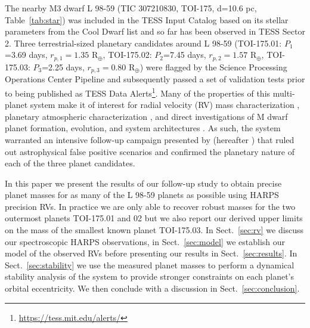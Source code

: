 \documentclass[longauth]{aa}
\begin{document}
The nearby M3 dwarf L 98-59 (TIC 307210830, TOI-175, d=10.6 pc, Table~\ref{tab:star}) was included in the TESS Input Catalog based on its stellar parameters from the Cool Dwarf list \citep{muirhead18} and so far has been observed in TESS Sector 2. Three terrestrial-sized planetary candidates around L 98-59 (TOI-175.01: $P_1$=3.69 days, $r_{p,1}=1.35$ R$_{\oplus}$, TOI-175.02: $P_2$=7.45 days, $r_{p,2}=1.57$ R$_{\oplus}$, TOI-175.03: $P_3$=2.25 days, $r_{p,3}=0.80$ R$_{\oplus}$) were flagged by the Science Processing Operations Center Pipeline \citep[SPOC;][]{jenkins16} and subsequently passed a set of validation tests \citep{twicken18,li19} prior to being published as TESS Data Alerts\footnote{\url{https://tess.mit.edu/alerts/}}. Many of the properties of this multi-planet system make it of interest for radial velocity (RV) mass characterization \citep{cloutier18b}, planetary atmospheric characterization \citep{kempton18,louie18}, and direct investigations of M dwarf planet formation, evolution, and system architectures \citep{lissauer11,fabrycky14}. As such, the system warranted an intensive follow-up campaign presented by  \citealt{kostov19} (hereafter ) that ruled out astrophysical false positive scenarios and confirmed the planetary nature of each of the three planet candidates. 

In this paper we present the results of our follow-up study to obtain precise planet masses for as many of the L 98-59 planets as possible using HARPS precision RVs. In practice we are only able to recover robust masses for the two outermost planets TOI-175.01 and 02 but we also report our derived upper limits on the mass of the smallest known planet TOI-175.03. In Sect.~\ref{sec:rv} we discuss our spectroscopic HARPS observations, in Sect.~\ref{sec:model} we establish our model of the observed RVs before presenting our results in Sect.~\ref{sec:results}. In Sect.~\ref{sec:stability} we use the measured planet masses to perform a dynamical stability analysis of the system to provide stronger constraints on each planet's orbital eccentricity. We then conclude with a discussion in Sect.~\ref{sec:conclusion}.
\end{document}
